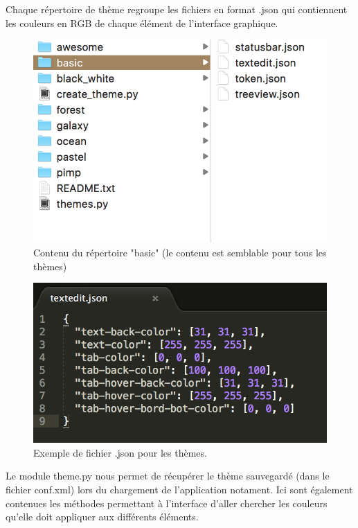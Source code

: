 \documentclass[a4paper,12pt]{article}
\begin{document}
			Chaque répertoire de thème regroupe les fichiers en format .json qui contiennent les couleurs en RGB de chaque élément de l'interface graphique.
			
			\begin{figure}[h!]
				\begin{center}
					\includegraphics[scale=0.7]{images/imgs_themes/basic_json}
					\caption{Contenu du répertoire "basic" (le contenu est semblable pour tous les thèmes)}
				\end{center}
			\end{figure}
			\begin{figure}[h!]
				\begin{center}
					\includegraphics[scale=0.7]{images/imgs_themes/exemple_json}
					\caption{Exemple de fichier .json pour les thèmes.}
				\end{center}
			\end{figure}
			
			Le module theme.py nous permet de récupérer le thème sauvegardé (dans le fichier conf.xml) lors du chargement de l'application notament. Ici sont également contenues les méthodes permettant à l'interface d'aller chercher les couleurs qu'elle doit appliquer aux différents éléments.\\
			
\end{document}

